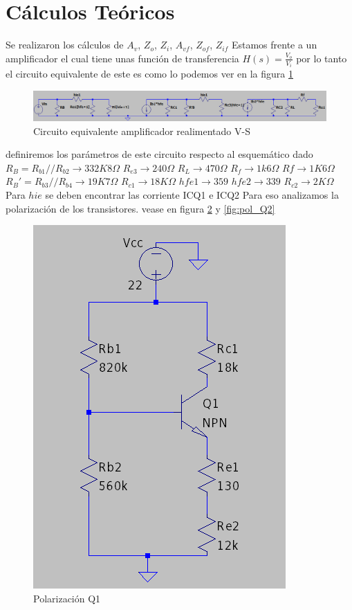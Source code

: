 \documentclass[12pt, letterpaper]{article}
\begin{document}
\section{Cálculos Teóricos}
Se realizaron los cálculos de $A_v$, $Z_o$, $Z_i$, $A_{vf}$, $Z_{of}$, $Z_{if}$
\singlespacing
Estamos frente a un amplificador el cual tiene unas función de transferencia $H(s)=\frac{V_o}{V_i}
$ por lo tanto el circuito equivalente de este es como lo podemos ver en la figura \ref{fig:cir_equivalente_señal}
\begin{figure}[H]
	\centering
	\includegraphics[width=1\textwidth]{Imagenes/circeq.png}
	\caption{Circuito equivalente amplificador realimentado V-S}
	\label{fig:cir_equivalente_señal}
\end{figure}
\singlespacing
definiremos los parámetros de este circuito respecto al esquemático dado
\singlespacing
$R_B=R_{b1}//R_{b2} \rightarrow 332K8\Omega$\hspace{1cm} 
\singlespacing
$R_{e3} \rightarrow 240\Omega$\hspace{1cm} $R_{L} \rightarrow 470\Omega$ \hspace{1cm} $R_{f} \rightarrow 1k6\Omega$
\singlespacing
$Rf \rightarrow 1K6\Omega$ \hspace{1cm} $R_B'=R_{b3}//R_{b4} \rightarrow 19K7\Omega$ \hspace{1cm} $R_{c1} \rightarrow18K\Omega$
\singlespacing
$hfe1 \rightarrow 359$ \hspace{1cm} $hfe2 \rightarrow 339$\hspace{1cm} $R_{c2}  \rightarrow 2K\Omega$
\singlespacing
Para $hie$ se deben encontrar las corriente ICQ1 e ICQ2 Para eso analizamos la polarización de los transistores. vease en figura \ref{fig:pol_Q1} y \ref{fig:pol_Q2}
\begin{figure}[H]
	\centering
	\includegraphics[height=0.75\textwidth]{Imagenes/polarizacionQ1.png}
	\caption{Polarización Q1}
	\label{fig:pol_Q1}
\end{figure}
\end{document}
